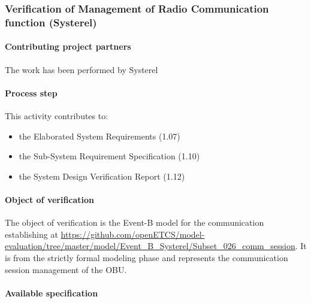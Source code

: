 

\subsubsection{Verification of Management of Radio Communication function (Systerel) }
\label{sec:}

\paragraph{Contributing project partners}
The work has been performed by Systerel

\paragraph{Process step}


This activity contributes to:
\begin{itemize}
\item the Elaborated System Requirements (1.07)
\item the Sub-System Requirement Specification (1.10)
\item the System Design Verification Report  (1.12)  
\end{itemize}



\paragraph{Object of verification}

The object of verification is the Event-B model for the communication
establishing at {\url{https://github.com/openETCS/model-evaluation/tree/master/model/Event_B_Systerel/Subset_026_comm_session}}. It
is from the strictly formal modeling phase and represents the communication
session management of the OBU.


\paragraph{Available specification}


